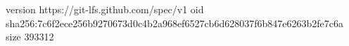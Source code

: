 version https://git-lfs.github.com/spec/v1
oid sha256:7c6f2ece256b9270673d0c4b2a968ef6527cb6d628037f6b847e6263b2fe7c6a
size 393312
